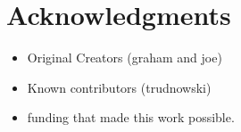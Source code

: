 \chapter*{Acknowledgments}

\begin{itemize}
\item Original Creators (graham and joe)
\item Known contributors (trudnowski)
\item funding that made this work possible.
\end{itemize}
